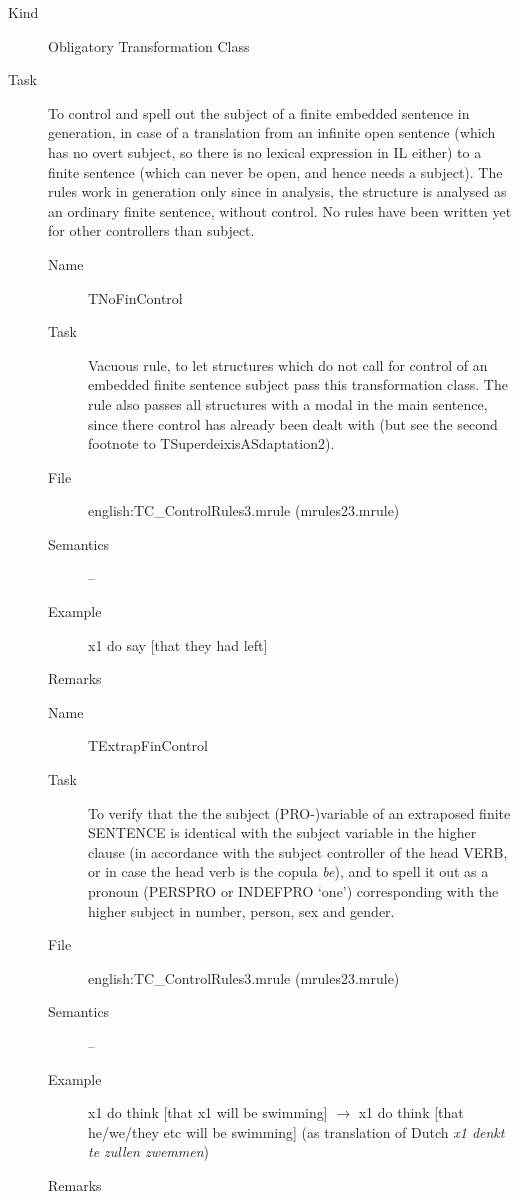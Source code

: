 \begin{description}
\item[Kind] Obligatory Transformation Class
\item[Task] To control and spell out the subject of a finite embedded 
sentence in generation, in case of a translation from an infinite open 
sentence (which has no overt subject, so there is no lexical expression in IL 
either) to a finite sentence  (which can never be open, and hence needs a 
subject). 
The rules work in generation only since in analysis, the structure 
is analysed as an ordinary finite sentence, without control. No rules have 
been written yet for other controllers than subject.


\vspace{1 cm}
\begin{description}
\item[Name] TNoFinControl
\item[Task] Vacuous rule, to let structures which do not call for control of an 
embedded finite sentence subject pass this transformation class. The rule also 
passes all structures with a modal in the main sentence, 
since there control has already
been dealt with (but see the second footnote to TSuperdeixisASdaptation2).
\item[File] english:TC\_ControlRules3.mrule (mrules23.mrule)
\item[Semantics] --
\item[Example] x1 do say [that they had left] 
\item[Remarks] 
\end{description}

\vspace{1 cm}
\begin{description}
\item[Name]  TExtrapFinControl
\item[Task] To verify that the the subject (PRO-)variable of an extraposed
finite SENTENCE is identical with the subject variable in the higher clause
(in accordance with the subject controller of the head VERB, or in case the 
head verb is the copula {\em be\/}), 
and to spell it out as a pronoun (PERSPRO or INDEFPRO `one') corresponding 
with the higher subject in number, person, sex and gender.
\item[File] english:TC\_ControlRules3.mrule (mrules23.mrule)
\item[Semantics] --
\item[Example] x1 do think [that x1 will be swimming] $\rightarrow$ x1 do 
think [that he/we/they etc will be swimming] (as translation of Dutch {\em x1 
denkt te zullen zwemmen\/})
\item[Remarks] 
\end{description}


\end{description}
